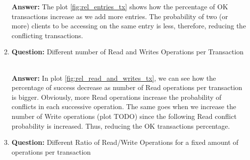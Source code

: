 \documentclass[a4paper, 10pt]{article}
\begin{document}
\begin{enumerate}
\textbf{Answer:} The plot \ref{fig:rel_entries_tx} shows how the percentage of OK transactions increase as we add more entries. The probability of two (or more) clients to be accessing on the same entry is less, therefore, reducing the conflicting transactions.

\item \textbf{Question:} Different number of Read and Writes Operations per Transaction\\\\

  \begin{minipage}[hbt!]{\linewidth}
    \centering
    \label{fig:rel_read_and_writes_tx}
  \end{minipage}


\textbf{Answer:} In plot \ref{fig:rel_read_and_writes_tx},  we can see how the percentage of success decrease as number of Read operations per transaction is bigger. Obviously, more Read operations increase the probability of conflicts in each successive operation. The same goes when we increase the number of Write operations (plot TODO) since the following Read conflict probability is increased. Thus, reducing the OK transactions percentage.

\item \textbf{Question:} Different Ratio of Read/Write Operations for a fixed
  amount of operations per transaction \\\\


\end{enumerate}
\end{document}
